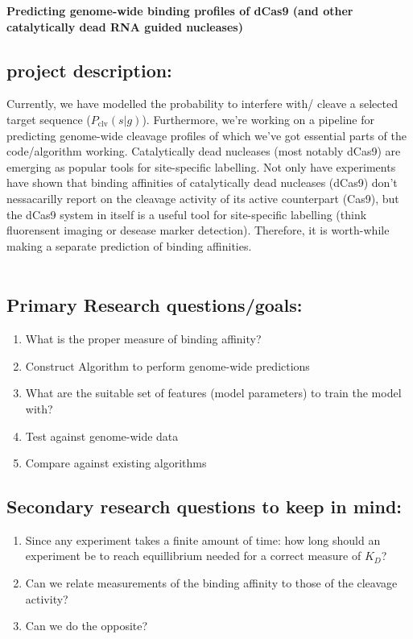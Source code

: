 \documentclass[a4paper,twoside]{revtex4-1}
\newcommand{\Pclv}{\ensuremath{P_{\text{clv}}}}
\begin{document}
\begin{center}
{\bf \Large {Predicting genome-wide binding profiles of dCas9 (and other catalytically dead RNA guided nucleases)}}
\vspace{10pt} \\ 
\end{center}



\subsection{project description:} 
Currently, we have modelled the probability to interfere with/ cleave a selected target sequence ($\Pclv(s|g)$). Furthermore, we're working on a pipeline for predicting genome-wide cleavage profiles of which we've got essential parts of the code/algorithm working. Catalytically dead nucleases (most notably dCas9) are emerging as popular tools for site-specific labelling. Not only have experiments have shown that binding affinities of catalytically dead nucleases (dCas9) don't nessacarilly report on the cleavage activity of its active counterpart (Cas9), but the dCas9 system in itself is a useful tool for site-specific labelling (think fluorensent imaging or desease marker detection).
Therefore, it is worth-while making a separate prediction of  binding affinities.  
\\ \\ 
\subsection{Primary Research questions/goals:} 
\begin{enumerate}
\item What is the proper measure of binding affinity? 
\item Construct Algorithm to perform genome-wide predictions
\item What are the suitable set of features (model parameters) to train the model with? 
\item Test against genome-wide data
\item Compare against existing algorithms 
\end{enumerate}


\subsection{Secondary research questions to keep in mind:}
\begin{enumerate}
\item Since any experiment takes a finite amount of time: how long should an experiment be to reach equillibrium needed for a correct measure of $K_D$? 
\item Can we relate measurements of the binding affinity to those of the cleavage activity? 
\item Can we do the opposite?  
\end{enumerate}
\end{document}
